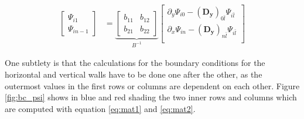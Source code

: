 \begin{align}
\begin{bmatrix} \Psi_{i1} \\ \Psi_{in-1}
\end{bmatrix} &=
\underbrace{\begin{bmatrix} b_{11} & b_{12} \\ b_{21} & b_{22} 
\end{bmatrix}}_{B^{-1}}
\begin{bmatrix}
\partial_y\Psi_{i0} - (\mathbf{D_y})_{0\bar{l}}\Psi_{i\bar{l}} \\
\partial_x\Psi_{in} - (\mathbf{D_y})_{n\bar{l}}\Psi_{i\bar{l}} \\
\end{bmatrix}
\label{eq:mat2}
\end{align}

One subtlety is that the calculations for the boundary conditions for the
horizontal and vertical walls have to be done one after the other, as the
outermost values in the first rows or columns are dependent on each other.
Figure \ref{fig:bc_psi} shows in blue and red shading the two inner rows and
columns which are computed with equation \eqref{eq:mat1} and \eqref{eq:mat2}.

